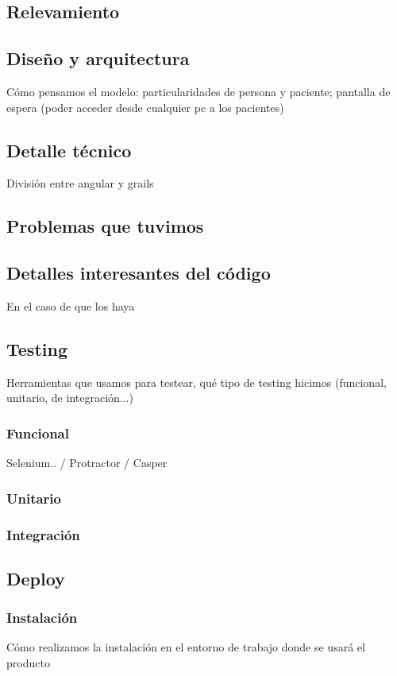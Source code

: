 \documentclass[a4paper,10pt]{article}
\begin{document}
\subsection{Relevamiento}

\subsection{Diseño y arquitectura}
Cómo pensamos el modelo: particularidades de persona y paciente; pantalla de espera (poder acceder desde cualquier pc a los pacientes)

\subsection{Detalle técnico}
División entre angular y grails

\subsection{Problemas que tuvimos}


\subsection{Detalles interesantes del código}
En el caso de que los haya 




\subsection{Testing}
Herramientas que usamos para testear, qué tipo de testing hicimos (funcional, unitario, de integración...)
\subsubsection{Funcional}
Selenium.. / Protractor / Casper
\subsubsection{Unitario}

\subsubsection{Integración}

\subsection{Deploy}


\subsubsection{Instalación}
Cómo realizamos la instalación en el entorno de trabajo donde se usará el producto
\end{document}
